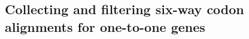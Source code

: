 

\subsection{Collecting and filtering six-way codon alignments for one-to-one genes}
\label{sec_ils_mask}

